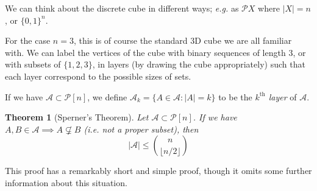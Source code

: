 \documentclass[]{article}
\theoremstyle{custhm}
\theoremstyle{cusdef}
\theoremstyle{custhm}
\theoremstyle{custhm}
\theoremstyle{custhm}
\theoremstyle{custhm}
\newtheorem*{theorem*}{Theorem}
\theoremstyle{cusdef}
\theoremstyle{remark}
\theoremstyle{custhm}
\renewcommand{\it}[1]{\textit{#1}}
\newcommand{\A}{\mathcal{A}}
\begin{document}
We can think about the discrete cube in different ways; \it{e.g.} as $\mathcal{P}X$ where $|X| = n$, or $\{0,1\}^n$.

For the case $n = 3$, this is of course the standard 3D cube we are all familiar with. We can label the vertices of the cube with binary sequences of length 3, or with subsets of $\{1,2,3\}$, in layers (by drawing the cube appropriately) such that each layer correspond to the possible sizes of sets.

If we have $\A \subset \mathcal{P}[n]$, we define $\A_k = \{A\in\A:|A| = k\}$ to be the \it{$k^{\textrm{th}}$ layer} of $\A$.

\begin{theorem*}[Sperner's Theorem]
Let $\A \subset \mathcal{P}[n]$. If we have $A,B\in\A\implies A\not\subsetneq B$ (\textrm{i.e.} not a proper subset), then
\[
|\A| \le \binom{n}{\lfloor n/2 \rfloor}
\]
\end{theorem*}
This proof has a remarkably short and simple proof, though it omits some further information about this situation.
\end{document}
